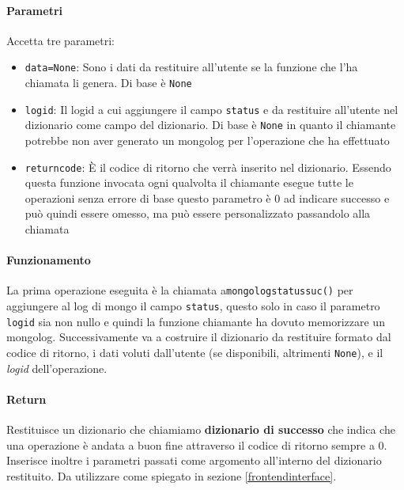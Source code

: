 \documentclass[11pt]{article}
\begin{document}
\paragraph{Parametri}
Accetta tre parametri:
\begin{itemize}
	\item{\texttt{data=None}: Sono i dati da restituire all'utente se la funzione che l'ha chiamata li genera. Di base è \texttt{None}}
	\item{\texttt{logid}: Il logid a cui aggiungere il campo \texttt{status} e da restituire all'utente nel dizionario come campo del dizionario.
		Di base è \texttt{None} in quanto il chiamante potrebbe non aver generato un mongolog per l'operazione che ha effettuato}
	\item{\texttt{returncode}: È il codice di ritorno che verrà inserito nel dizionario.
		Essendo questa funzione invocata ogni qualvolta il chiamante esegue tutte le operazioni senza errore di base questo parametro è 0
		ad indicare successo e può quindi essere omesso, ma può essere personalizzato passandolo alla chiamata}
\end{itemize}
\paragraph{Funzionamento}
La prima operazione eseguita è la chiamata a\texttt{mongologstatussuc()} per aggiungere al log di mongo il campo \texttt{status},
questo solo in caso il parametro \texttt{logid} sia non nullo e quindi la funzione chiamante ha dovuto memorizzare un mongolog.
Successivamente va a costruire il dizionario da restituire formato dal codice di ritorno, i dati voluti dall'utente (se disponibili,
altrimenti \texttt{None}), e il \textit{logid} dell'operazione.
\paragraph{Return}\label{successdict}
Restituisce un dizionario che chiamiamo \textbf{dizionario di successo} che indica che una operazione è andata a buon fine attraverso
il codice di ritorno sempre a 0. Inserisce inoltre i parametri passati 	come argomento all'interno del dizionario restituito.
Da utilizzare come spiegato in sezione \ref{frontendinterface}.
\end{document}
